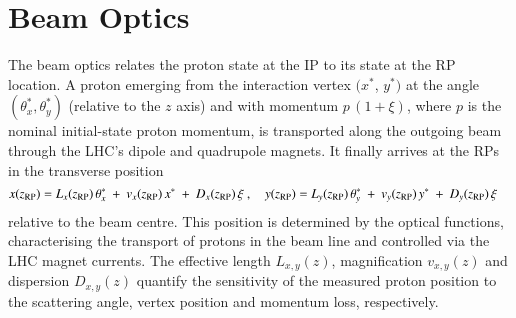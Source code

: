 \section{Beam Optics}
\label{sec:beam optics}
%
The beam optics relates the proton state at the IP to its state at the RP location. 
A proton emerging from the interaction vertex $(x^*$, $y^*)$ at the angle $(\theta_x^*,\theta_y^*)$ (relative to the $z$ axis) and with momentum $p\,(1+\xi)$, where $p$ is the nominal initial-state proton momentum, is transported along the outgoing beam through the LHC's dipole and quadrupole magnets. It finally 
arrives at the RPs in the transverse position
\begin{equation}
\label{eq:prot trans}
x(z_{\rm RP}) = L_x(z_{\rm RP})\, \theta_x^*\ +\ v_x(z_{\rm RP})\, x^*\ +\ D_x(z_{\rm RP})\, \xi\ ,\quad y(z_{\rm RP}) = L_y(z_{\rm RP})\, \theta_y^*\ +\ v_y(z_{\rm RP})\, y^*\ +\ D_y(z_{\rm RP})\, \xi \quad
\end{equation}
relative to the beam centre. This position is determined by the optical functions, characterising the transport of protons in the beam line and controlled via 
the LHC magnet currents.
The effective length $L_{x,y}(z)$, magnification $v_{x,y}(z)$ and dispersion $D_{x,y}(z)$ quantify the sensitivity of the measured proton position to the 
scattering angle, vertex position and momentum loss, respectively.

